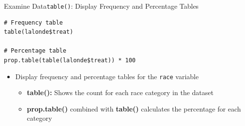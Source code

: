\documentclass[hyperref={pdfpagelabels=false}]{beamer}
\begin{document}
\begin{frame}[fragile]{Examine Data}{\texttt{table()}: Display Frequency and Percentage Tables}
\begin{lstlisting}
# Frequency table
table(lalonde$treat)

# Percentage table
prop.table(table(lalonde$treat)) * 100
\end{lstlisting}
\begin{itemize}
	\vspace{0.2cm}
	\item Display frequency and percentage tables for the \texttt{race} variable
	\vspace{0.2cm}
	\begin{itemize}
		\item \textbf{table():} Shows the count for each race category in the dataset
		\vspace{0.2cm}
		\item \textbf{prop.table()} combined with \textbf{table()} calculates the percentage for each category
	\end{itemize}
\end{itemize}
\end{frame}
\end{document}
